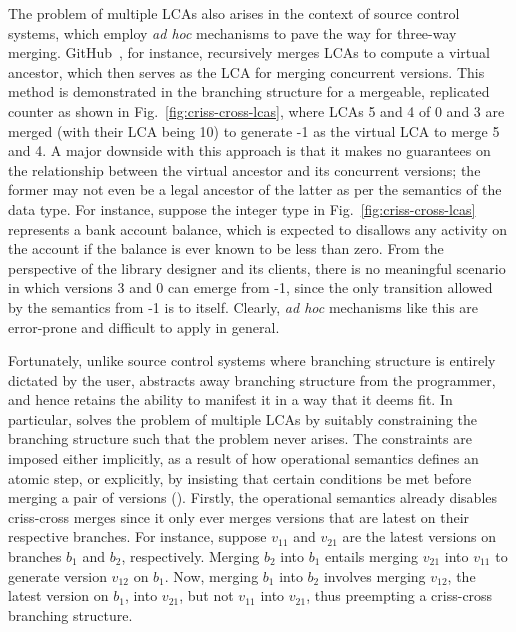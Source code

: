 The problem of multiple LCAs also arises in the context of source
control systems, which employ \emph{ad hoc} mechanisms to pave the way
for three-way merging.  GitHub~\cite{github}, for instance,
recursively merges LCAs to compute a virtual ancestor, which then
serves as the LCA for merging concurrent versions. This method is
demonstrated in the branching structure for a mergeable, replicated
counter as shown in Fig.~\ref{fig:criss-cross-lcas}, where LCAs 5 and
4 of 0 and 3 are merged (with their LCA being 10) to generate -1 as
the virtual LCA to merge 5 and 4. A major downside with this approach
is that it makes no guarantees on the relationship between the virtual
ancestor and its concurrent versions; the former may not even be a
legal ancestor of the latter as per the semantics of the data type.
For instance, suppose the integer type in
Fig.~\ref{fig:criss-cross-lcas} represents a bank account balance,
which is expected to disallows any activity on the account if the
balance is ever known to be less than zero.  From the perspective of
the library designer and its clients, there is no meaningful scenario
in which versions 3 and 0 can emerge from -1, since the only
transition allowed by the semantics from -1 is to itself.  Clearly,
\emph{ad hoc} mechanisms like this are error-prone and difficult to
apply in general.

Fortunately, unlike source control systems where branching structure
is entirely dictated by the user, \name abstracts away branching
structure from the programmer, and hence retains the ability to
manifest it in a way that it deems fit. In particular, \name solves
the problem of multiple LCAs by suitably constraining the branching
structure such that the problem never arises. The constraints are
imposed either implicitly, as a result of how operational semantics
defines an atomic step, or explicitly, by insisting that certain
conditions be met before merging a pair of versions
(). Firstly, the operational semantics already
disables criss-cross merges since it only ever merges versions that
are latest on their respective branches. For instance, suppose
$v_{11}$ and $v_{21}$ are the latest versions on branches $b_1$ and
$b_2$, respectively. Merging $b_2$ into $b_1$ entails merging $v_{21}$
into $v_{11}$ to generate version $v_{12}$ on $b_1$.  Now, merging
$b_1$ into $b_2$ involves merging $v_{12}$, the latest version on
$b_1$, into $v_{21}$, but not $v_{11}$ into $v_{21}$, thus preempting
a criss-cross branching structure.

